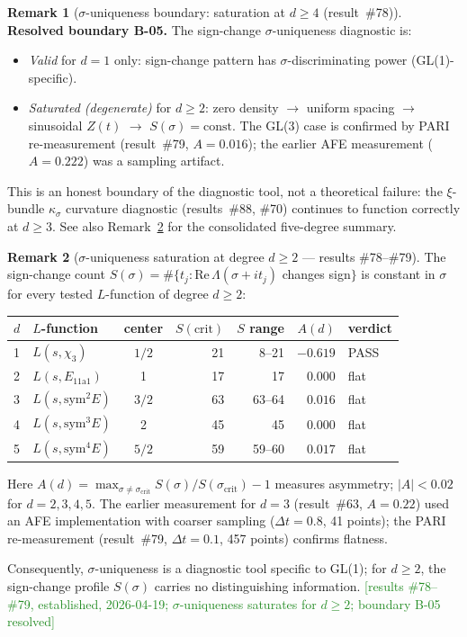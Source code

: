 \documentclass[11pt, a4paper]{article}
\theoremstyle{definition}
\newtheorem{remark}{Remark}[section]
\theoremstyle{plain}
\begin{document}
\begin{remark}[$\sigma$-uniqueness boundary: saturation at $d \geq 4$ (result~\#78)]
\medskip\noindent
\textbf{Resolved boundary B-05.}  The sign-change $\sigma$-uniqueness diagnostic is:
\begin{itemize}
  \item \emph{Valid} for $d = 1$ only: sign-change pattern has $\sigma$-discriminating power (GL(1)-specific).
  \item \emph{Saturated (degenerate)} for $d \geq 2$: zero density $\to$ uniform spacing $\to$ sinusoidal $Z(t)$ $\to$ $S(\sigma) = \text{const}$.
    The GL(3) case is confirmed by PARI re-measurement (result~\#79, $A=0.016$);
    the earlier AFE measurement ($A=0.222$) was a sampling artifact.
\end{itemize}
This is an honest boundary of the diagnostic tool, not a theoretical failure: the $\xi$-bundle $\kappa_\sigma$ curvature diagnostic (results~\#88, \#70) continues to function correctly at $d \geq 3$.
See also Remark~\ref{rem:sigma_saturation} for the consolidated five-degree summary.
\end{remark}

\begin{remark}[$\sigma$-uniqueness saturation at degree $d \geq 2$ --- results \#78--\#79]
\label{rem:sigma_saturation}
The sign-change count $S(\sigma) = \#\{t_j : \mathrm{Re}\,\Lambda(\sigma+it_j)$
changes sign$\}$ is constant in $\sigma$ for every tested $L$-function of degree
$d \geq 2$:
\smallskip
\begin{center}
\small
\begin{tabular}{@{}llcrrrl@{}}
\toprule
$d$ & $L$-function & center & $S(\text{crit})$ & $S$ range & $A(d)$ & verdict \\
\midrule
1 & $L(s,\chi_3)$ & $1/2$ & 21 & 8--21 & $-0.619$ & PASS \\
2 & $L(s,E_{11\mathrm{a}1})$ & 1 & 17 & 17 & $0.000$ & flat \\
3 & $L(s,\mathrm{sym}^2 E)$ & $3/2$ & 63 & 63--64 & $0.016$ & flat \\
4 & $L(s,\mathrm{sym}^3 E)$ & 2 & 45 & 45 & $0.000$ & flat \\
5 & $L(s,\mathrm{sym}^4 E)$ & $5/2$ & 59 & 59--60 & $0.017$ & flat \\
\bottomrule
\end{tabular}
\end{center}
\smallskip\noindent
Here $A(d) = \max_{\sigma \neq \sigma_{\mathrm{crit}}} S(\sigma)/S(\sigma_{\mathrm{crit}}) - 1$
measures asymmetry; $|A| < 0.02$ for $d = 2,3,4,5$.
The earlier measurement for $d = 3$ (result~\#63, $A = 0.22$) used an AFE implementation
with coarser sampling ($\Delta t = 0.8$, 41 points); the PARI re-measurement
(result~\#79, $\Delta t = 0.1$, 457 points) confirms flatness.

Consequently, $\sigma$-uniqueness is a diagnostic tool specific to GL(1); for
$d \geq 2$, the sign-change profile $S(\sigma)$ carries no distinguishing information.
\textcolor{ForestGreen}{[results \#78--\#79, established, 2026-04-19;
$\sigma$-uniqueness saturates for $d \geq 2$; boundary B-05 resolved]}
\end{remark}
\end{document}
